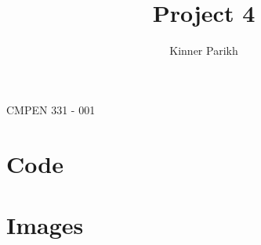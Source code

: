 \documentclass[11pt]{article}
\begin{document}
%
\author{Kinner Parikh}
\title{Project 4}
\maketitle
\begin{center}
    CMPEN 331 - 001
\end{center}

\newpage

\section{Code}


\ttfamily


\newpage

\ttfamily


\newpage

\ttfamily


\rmfamily
\section{Images}
\end{document}
